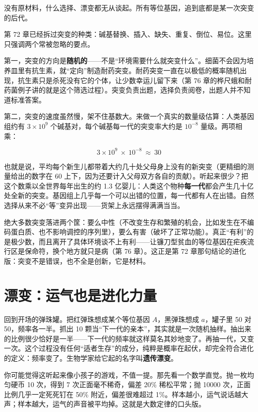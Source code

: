 没有原材料，什么选择、漂变都无从谈起。所有等位基因，追到底都是某一次突变的后代。

第 72 章已经拆过突变的种类：碱基替换、插入、缺失、重复、倒位、易位。这里只强调两个常被忽略的要点。

第一，突变的方向是\textbf{随机的}——不是“环境需要什么就突变什么”。细菌不会因为培养皿里有抗生素，就“定向”制造耐药突变。耐药突变一直在以极低的概率随机出现，抗生素只是杀死没有它的个体，让少数幸运儿留下来（第 76 章的桦尺蛾和耐药菌例子讲的就是这个筛选过程）。突变负责出题，选择负责阅卷，出题人并不知道标准答案。

第二，突变的速度虽然慢，架不住基数大。来做一个真实的数量级估算：人类基因组约有 $3\times 10^{9}$ 个碱基对，每个碱基每一代的突变率大约是 $10^{-8}$ 量级。两项相乘：

\[
3\times 10^{9}\ \times\ 10^{-8}\ \approx\ 30
\]

也就是说，平均每个新生儿都带着大约几十处父母身上没有的新突变（更精细的测量给出的数字在 60 上下，因为还要计入父母双方各自的贡献）。听起来很少？把这个数乘以全世界每年出生的约 1.3 亿婴儿：人类这个物种\textbf{每一代}都会产生几十亿处全新的突变。基因组上几乎每一个可以出错的位置，每一代都有人在出错。自然选择从来不必“等”变异出现——货架上永远摆得满满当当。

绝大多数突变落进两个筐：要么中性（不改变生存和繁殖的机会，比如发生在不编码蛋白质、也不影响调控的序列里），要么有害（破坏了正常功能）。真正“有利”的是极少数，而且离开了具体环境谈不上有利——让镰刀型贫血的等位基因在疟疾流行区是保命符，换个地方就只是病（第 76 章）。这正是第 72 章那句结论的进化版：突变不是错误，也不全是创新，它是材料。

\section{漂变：运气也是进化力量}

回到开场的弹珠罐。把红弹珠想成某个等位基因 $A$，黑弹珠想成 $a$，罐子里 50 对 50，频率各一半。抓出 10 颗当“下一代的亲本”，其实就是一次随机抽样。抽出来的比例很少恰好是一半——下一代的频率就这样莫名其妙地变了。再抽一代，又变一次。这个过程没有任何“适者生存”的成分，纯粹是概率在起伏，却完全符合进化的定义：频率变了。生物学家给它起的名字叫\textbf{遗传漂变}。

你可能觉得这听起来像小孩子的游戏，不值一提。那先看一个数学直觉。抛一枚均匀硬币 10 次，得到 7 次正面毫不稀奇，偏差 20\% 稀松平常；抛 10000 次，正面比例几乎一定死死钉在 50\% 附近，偏差很难超过 1\%。样本越小，运气说话越大声；样本越大，运气的声音被平均掉。这就是大数定律的口头版。

